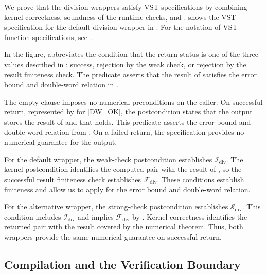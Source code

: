 We prove that the division wrappers satisfy VST specifications by
combining kernel correctness, soundness of the runtime checks,
and .
 shows the VST
specification for the
default division wrapper in .
For the notation of VST function specifications, see
\citet[Chapter~8]{AppelVCManual}.

In the figure,  abbreviates the
condition that the return status is one of the three values
described in : success,
rejection by the weak check, or rejection by the result finiteness
check. The predicate
 asserts that the result of
\DWDivFP{} satisfies the error bound and double-word relation in
.



The empty  clause imposes no numerical preconditions
on the caller. On successful return, represented by
 for \ccode|DW_OK|, the postcondition states that
the output stores the result of \DWDivFP{} and that
 holds. This predicate
asserts the error bound and double-word relation from
. On a failed return, the
specification provides no numerical guarantee for the output.

For the default wrapper, the weak-check postcondition establishes
$\mathcal{I}_{\mathrm{div}}$. The kernel postcondition identifies
the computed pair with the result of \DWDivFP{}, so the successful
result finiteness check establishes
$\mathcal{F}_{\mathrm{div}}$. These conditions establish
finiteness and allow us to apply
 for the error bound and double-word
relation.

For the alternative wrapper, the strong-check postcondition
establishes $\mathcal{S}_{\mathrm{div}}$. This condition includes
$\mathcal{I}_{\mathrm{div}}$ and implies
$\mathcal{F}_{\mathrm{div}}$ by
. Kernel correctness
identifies the returned pair with the result covered by the
numerical theorem. Thus, both wrappers provide the same numerical
guarantee on successful return.

\subsection{Compilation and the Verification Boundary}
\label{sec:verification-boundary}


